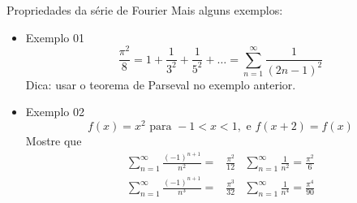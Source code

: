       \begin{slide}[toc = ]{Propriedades da série de Fourier}
	      Mais alguns exemplos:
	      \begin{itemize}
		      \item Exemplo 01
			      \begin{equation*}
				      \frac{\pi^2}{8} = 1+\frac{1}{3^2} +\frac{1}{5^2} +\dots = \sum_{n=1}^\infty \frac{1}{(2n-1)^2}
			      \end{equation*}
			      Dica: usar o teorema de Parseval no exemplo anterior.
		      \item Exemplo 02
			      \begin{equation*}
				      f(x) = x^2 \text{ para } -1<x<1, \text { e } f(x+2) = f(x)
			      \end{equation*}
			      Mostre que
				      \begin{align*}
					      \sum_{n=1}^\infty \frac{(-1)^{n+1}}{n^2} =& \frac{\pi^2}{12} &
					      \sum_{n=1}^\infty \frac{1}{n^2} = \frac{\pi^2}{6}\\
					      \sum_{n=1}^\infty \frac{(-1)^{n+1}}{n^3} =& \frac{\pi^3}{32} &
					      \sum_{n=1}^\infty \frac{1}{n^4} = \frac{\pi^4}{90}
				      \end{align*}

	      \end{itemize}
      \end{slide}
